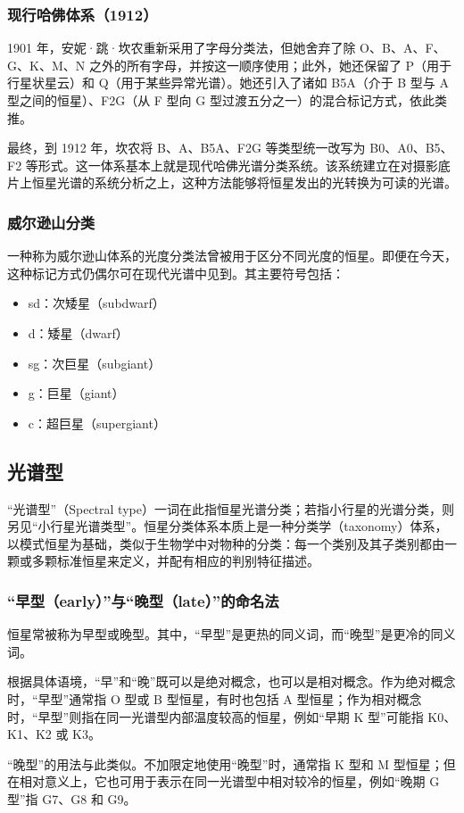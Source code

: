 \subsubsection{现行哈佛体系（1912）}
1901 年，安妮·跳·坎农重新采用了字母分类法，但她舍弃了除 O、B、A、F、G、K、M、N 之外的所有字母，并按这一顺序使用；此外，她还保留了 P（用于行星状星云）和 Q（用于某些异常光谱）。她还引入了诸如 B5A（介于 B 型与 A 型之间的恒星）、F2G（从 F 型向 G 型过渡五分之一）的混合标记方式，依此类推。

最终，到 1912 年，坎农将 B、A、B5A、F2G 等类型统一改写为 B0、A0、B5、F2 等形式。这一体系基本上就是现代哈佛光谱分类系统。该系统建立在对摄影底片上恒星光谱的系统分析之上，这种方法能够将恒星发出的光转换为可读的光谱。
\subsubsection{威尔逊山分类}
一种称为威尔逊山体系的光度分类法曾被用于区分不同光度的恒星。即便在今天，这种标记方式仍偶尔可在现代光谱中见到。其主要符号包括：
\begin{itemize}
\item sd：次矮星（subdwarf）
\item d：矮星（dwarf）
\item sg：次巨星（subgiant）
\item g：巨星（giant）
\item c：超巨星（supergiant）
\end{itemize}
\subsection{光谱型}
“光谱型”（Spectral type）一词在此指恒星光谱分类；若指小行星的光谱分类，则另见“小行星光谱类型”。恒星分类体系本质上是一种分类学（taxonomy）体系，以模式恒星为基础，类似于生物学中对物种的分类：每一个类别及其子类别都由一颗或多颗标准恒星来定义，并配有相应的判别特征描述。
\subsubsection{“早型（early）”与“晚型（late）”的命名法}
恒星常被称为早型或晚型。其中，“早型”是更热的同义词，而“晚型”是更冷的同义词。

根据具体语境，“早”和“晚”既可以是绝对概念，也可以是相对概念。作为绝对概念时，“早型”通常指 O 型或 B 型恒星，有时也包括 A 型恒星；作为相对概念时，“早型”则指在同一光谱型内部温度较高的恒星，例如“早期 K 型”可能指 K0、K1、K2 或 K3。

“晚型”的用法与此类似。不加限定地使用“晚型”时，通常指 K 型和 M 型恒星；但在相对意义上，它也可用于表示在同一光谱型中相对较冷的恒星，例如“晚期 G 型”指 G7、G8 和 G9。

